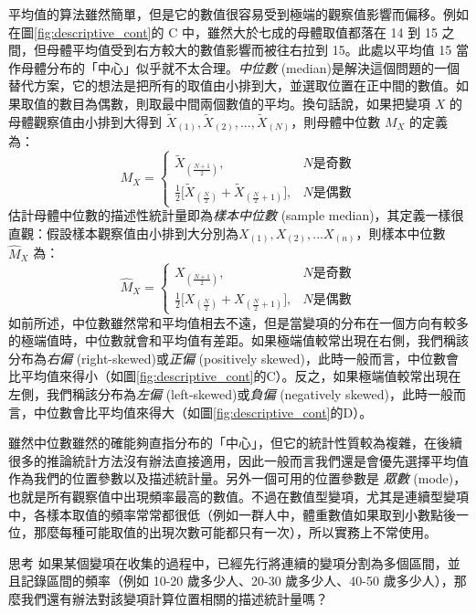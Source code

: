     平均值的算法雖然簡單，但是它的數值很容易受到極端的觀察值影響而偏移。例如在圖\ref{fig:descriptive_cont}的 C 中，雖然大於七成的母體取值都落在 14 到 15 之間，但母體平均值受到右方較大的數值影響而被往右拉到 15。此處以平均值 15 當作母體分布的「中心」似乎就不太合理。\textit{中位數} (median)是解決這個問題的一個替代方案，它的想法是把所有的取值由小排到大，並選取位置在正中間的數值。如果取值的數目為偶數，則取最中間兩個數值的平均。換句話說，如果把變項 $X$ 的母體觀察值由小排到大得到 $\tilde{X}_{(1)}, \tilde{X}_{(2)}, ..., \tilde{X}_{(N)}$，則母體中位數 $M_X$ 的定義為：
    \[M_X = \left\{\begin{array}{lr}
        \tilde{X}_{(\frac{N+1}{2})}, & N \text{是奇數}\\
        \frac{1}{2}\Big[\tilde{X}_{(\frac{N}{2})}+\tilde{X}_{(\frac{N}{2}+1)}\Big], & N \text{是偶數}
    \end{array}\right.\]
    估計母體中位數的描述性統計量即為\textit{樣本中位數} (sample median)，其定義一樣很直觀：假設樣本觀察值由小排到大分別為$X_{(1)}, X_{(2)}, ... X_{(n)}$，則樣本中位數 $\hat{M}_X$ 為：
    \[\hat{M}_X = \left\{\begin{array}{lr}
        X_{(\frac{N+1}{2})}, & N \text{是奇數}\\
        \frac{1}{2}\Big[X_{(\frac{N}{2})}+X_{(\frac{N}{2}+1)}\Big], & N \text{是偶數}
    \end{array}\right.\]
    如前所述，中位數雖然常和平均值相去不遠，但是當變項的分布在一個方向有較多的極端值時，中位數就會和平均值有差距。如果極端值較常出現在右側，我們稱該分布為\textit{右偏} (right-skewed)或\textit{正偏} (positively skewed)，此時一般而言，中位數會比平均值來得小（如圖\ref{fig:descriptive_cont}的C）。反之，如果極端值較常出現在左側，我們稱該分布為\textit{左偏} (left-skewed)或\textit{負偏} (negatively skewed)，此時一般而言，中位數會比平均值來得大（如圖\ref{fig:descriptive_cont}的D）。
    
    雖然中位數雖然的確能夠直指分布的「中心」，但它的統計性質較為複雜，在後續很多的推論統計方法沒有辦法直接適用，因此一般而言我們還是會優先選擇平均值作為我們的位置參數以及描述統計量。另外一個可用的位置參數是 \textit{眾數} (mode)，也就是所有觀察值中出現頻率最高的數值。不過在數值型變項，尤其是連續型變項中，各樣本取值的頻率常常都很低（例如一群人中，體重數值如果取到小數點後一位，那麼每種可能取值的出現次數可能都只有一次），所以實務上不常使用。

    \bigskip
    
    \begin{custom}{思考}
        如果某個變項在收集的過程中，已經先行將連續的變項分割為多個區間，並且記錄區間的頻率（例如 10-20 歲多少人、20-30 歲多少人、40-50 歲多少人），那麼我們還有辦法對該變項計算位置相關的描述統計量嗎？
    \end{custom}

